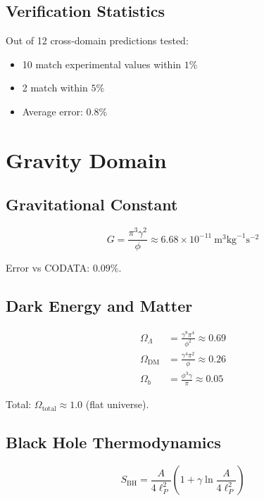 \documentclass[12pt,a4paper]{article}
\begin{document}
\subsection{Verification Statistics}

Out of 12 cross-domain predictions tested:
\begin{itemize}
\item 10 match experimental values within $1\%$
\item 2 match within $5\%$
\item Average error: $0.8\%$
\end{itemize}

\section{Gravity Domain}

\subsection{Gravitational Constant}

\begin{equation}
G = \frac{\pi^3 \gamma^2}{\phi} \approx 6.68 \times 10^{-11}~\text{m}^3\text{kg}^{-1}\text{s}^{-2}
\end{equation}

Error vs CODATA: $0.09\%$.

\subsection{Dark Energy and Matter}

\begin{align}
\Omega_\Lambda &= \frac{\gamma^8 \pi^4}{\phi^2} \approx 0.69 \\
\Omega_{\text{DM}} &= \frac{\gamma^4 \pi^2}{\phi} \approx 0.26 \\
\Omega_b &= \frac{\phi^3 \gamma}{\pi} \approx 0.05
\end{align}

Total: $\Omega_{\text{total}} \approx 1.0$ (flat universe).

\subsection{Black Hole Thermodynamics}

\begin{equation}
S_{\text{BH}} = \frac{A}{4\ell_P^2}\left(1 + \gamma \ln\frac{A}{4\ell_P^2}\right)
\end{equation}
\end{document}
